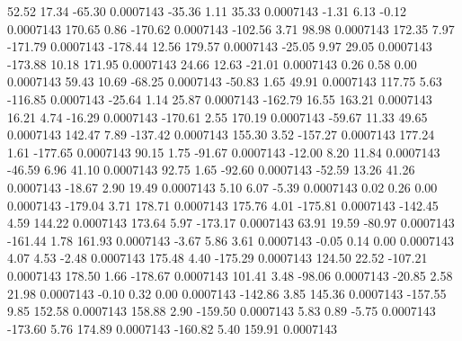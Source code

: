        52.52       17.34      -65.30     0.0007143
      -35.36        1.11       35.33     0.0007143
       -1.31        6.13       -0.12     0.0007143
      170.65        0.86     -170.62     0.0007143
     -102.56        3.71       98.98     0.0007143
      172.35        7.97     -171.79     0.0007143
     -178.44       12.56      179.57     0.0007143
      -25.05        9.97       29.05     0.0007143
     -173.88       10.18      171.95     0.0007143
       24.66       12.63      -21.01     0.0007143
        0.26        0.58        0.00     0.0007143
       59.43       10.69      -68.25     0.0007143
      -50.83        1.65       49.91     0.0007143
      117.75        5.63     -116.85     0.0007143
      -25.64        1.14       25.87     0.0007143
     -162.79       16.55      163.21     0.0007143
       16.21        4.74      -16.29     0.0007143
     -170.61        2.55      170.19     0.0007143
      -59.67       11.33       49.65     0.0007143
      142.47        7.89     -137.42     0.0007143
      155.30        3.52     -157.27     0.0007143
      177.24        1.61     -177.65     0.0007143
       90.15        1.75      -91.67     0.0007143
      -12.00        8.20       11.84     0.0007143
      -46.59        6.96       41.10     0.0007143
       92.75        1.65      -92.60     0.0007143
      -52.59       13.26       41.26     0.0007143
      -18.67        2.90       19.49     0.0007143
        5.10        6.07       -5.39     0.0007143
        0.02        0.26        0.00     0.0007143
     -179.04        3.71      178.71     0.0007143
      175.76        4.01     -175.81     0.0007143
     -142.45        4.59      144.22     0.0007143
      173.64        5.97     -173.17     0.0007143
       63.91       19.59      -80.97     0.0007143
     -161.44        1.78      161.93     0.0007143
       -3.67        5.86        3.61     0.0007143
       -0.05        0.14        0.00     0.0007143
        4.07        4.53       -2.48     0.0007143
      175.48        4.40     -175.29     0.0007143
      124.50       22.52     -107.21     0.0007143
      178.50        1.66     -178.67     0.0007143
      101.41        3.48      -98.06     0.0007143
      -20.85        2.58       21.98     0.0007143
       -0.10        0.32        0.00     0.0007143
     -142.86        3.85      145.36     0.0007143
     -157.55        9.85      152.58     0.0007143
      158.88        2.90     -159.50     0.0007143
        5.83        0.89       -5.75     0.0007143
     -173.60        5.76      174.89     0.0007143
     -160.82        5.40      159.91     0.0007143
